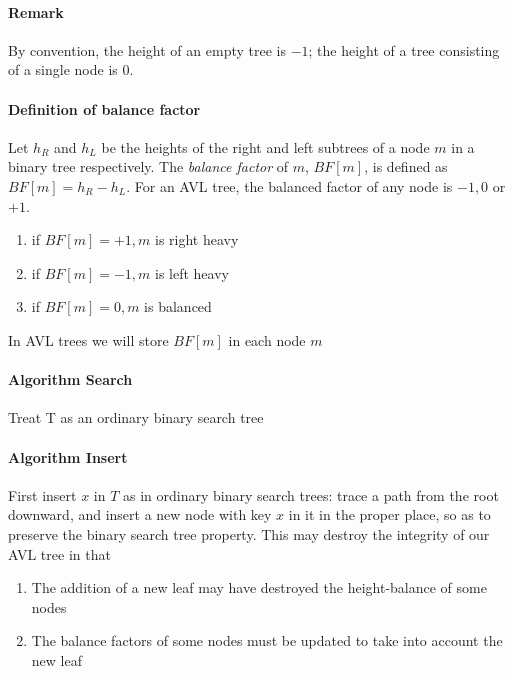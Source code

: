 \documentclass[11pt]{article}
\newcommand{\ti}[1]{\textit{#1}}
\begin{document}
	\paragraph{Remark} By convention, the height of an empty tree is $-1$; the height of a tree consisting of a single node is $0$.
	\paragraph{Definition of balance factor} Let $h_R$ and $h_L$ be the heights of the right and left subtrees of a node $m$ in a binary tree respectively. The \ti{balance factor} of $m$, $BF[m]$, is defined as $BF[m] = h_R - h_L$. \newline
	For an AVL tree, the balanced factor of any node is $-1, 0$ or $+1$. \newline
	\begin{enumerate}
		\item if $BF[m] = +1, m$ is right heavy
		\item if $BF[m] = -1, m$ is left heavy
		\item if $BF[m] = 0, m$ is balanced
	\end{enumerate}
	In AVL trees we will store $BF[m]$ in each node $m$
	\paragraph{Algorithm Search}
	Treat T as an ordinary binary search tree
	\paragraph{Algorithm Insert}
	First insert $x$ in $T$ as in ordinary binary search trees: trace a path from the root downward, and insert a new node with key $x$ in it in the proper place, so as to preserve the binary search tree property. This may destroy the integrity of our AVL tree in that 
	\begin{enumerate}
		\item The addition of a new leaf may have destroyed the height-balance of some nodes
		\item The balance factors of some nodes must be updated to take into account the new leaf
	\end{enumerate}
\end{document}
